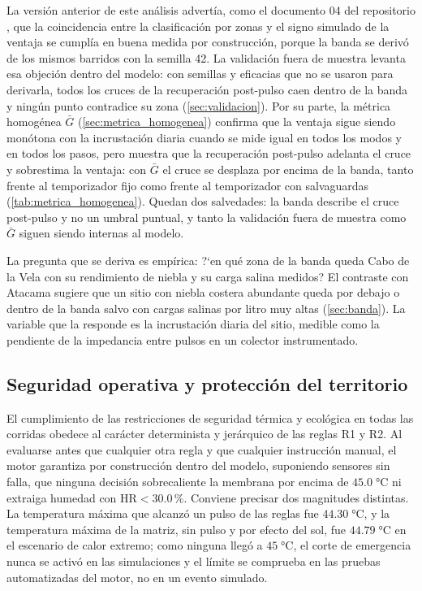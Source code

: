 La versi\'on anterior de este an\'alisis advert\'ia, como el documento 04 del repositorio \parencite[doc.~04, \S~7.8]{axioma2026engine}, que la coincidencia entre la clasificaci\'on por zonas y el signo simulado de la ventaja se cumpl\'ia en buena medida por construcci\'on, porque la banda se deriv\'o de los mismos barridos con la semilla 42. La validaci\'on fuera de muestra levanta esa objeci\'on dentro del modelo: con semillas y eficacias que no se usaron para derivarla, todos los cruces de la recuperaci\'on post-pulso caen dentro de la banda y ning\'un punto contradice su zona (\cref{sec:validacion}). Por su parte, la m\'etrica homog\'enea $\bar{G}$ (\cref{sec:metrica_homogenea}) confirma que la ventaja sigue siendo mon\'otona con la incrustaci\'on diaria cuando se mide igual en todos los modos y en todos los pasos, pero muestra que la recuperaci\'on post-pulso adelanta el cruce y sobrestima la ventaja: con $\bar{G}$ el cruce se desplaza por encima de la banda, tanto frente al temporizador fijo como frente al temporizador con salvaguardas (\cref{tab:metrica_homogenea}). Quedan dos salvedades: la banda describe el cruce post-pulso y no un umbral puntual, y tanto la validaci\'on fuera de muestra como $\bar{G}$ siguen siendo internas al modelo.

La pregunta que se deriva es emp\'irica: ?`en qu\'e zona de la banda queda Cabo de la Vela con su rendimiento de niebla y su carga salina medidos? El contraste con Atacama sugiere que un sitio con niebla costera abundante queda por debajo o dentro de la banda salvo con cargas salinas por litro muy altas (\cref{sec:banda}). La variable que la responde es la incrustaci\'on diaria del sitio, medible como la pendiente de la impedancia entre pulsos en un colector instrumentado.

\subsection{Seguridad operativa y protecci\'on del territorio}
El cumplimiento de las restricciones de seguridad t\'ermica y ecol\'ogica en todas las corridas obedece al car\'acter determinista y jer\'arquico de las reglas R1 y R2. Al evaluarse antes que cualquier otra regla y que cualquier instrucci\'on manual, el motor garantiza por construcci\'on dentro del modelo, suponiendo sensores sin falla, que ninguna decisi\'on sobrecaliente la membrana por encima de $45.0\;\si{\celsius}$ ni extraiga humedad con $\text{HR} < 30.0\,\%$. Conviene precisar dos magnitudes distintas. La temperatura m\'axima que alcanz\'o un pulso de las reglas fue $44.30\;\si{\celsius}$, y la temperatura m\'axima de la matriz, sin pulso y por efecto del sol, fue $44.79\;\si{\celsius}$ en el escenario de calor extremo; como ninguna lleg\'o a $45\;\si{\celsius}$, el corte de emergencia nunca se activ\'o en las simulaciones y el l\'imite se comprueba en las pruebas automatizadas del motor, no en un evento simulado.

